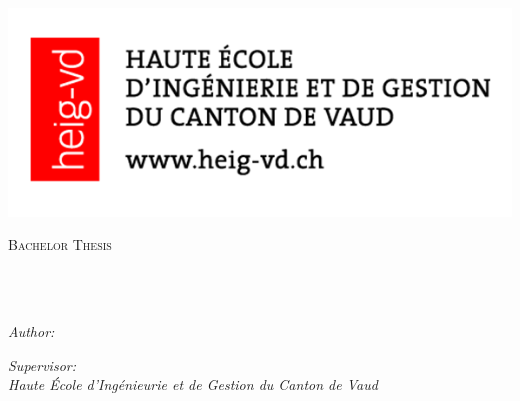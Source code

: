 \documentclass[
11pt, %
english, %
singlespacing, %
headsepline, %
]{MastersDoctoralThesis} %
\author{\textcolor{bleu}{Arthur \textsc{Passuello}}} %
\begin{document}
\frontmatter %

\pagestyle{plain} %


\begin{titlepage}

\vspace*{-20mm}
\includegraphics[scale = 0.5]{Figures/heigvd_logo.png}
\begin{center}
\textsc{\Large Bachelor Thesis}\\[0.5cm] %

\HRule \\[0.4cm] %
{\huge \bfseries \ttitle\par}\vspace{0.4cm} %
\HRule \\[1.5cm] %
\begin{minipage}[t]{0.4\textwidth}
\begin{flushleft} \large
\emph{Author:}\\
\href{http://www.johnsmith.com}{\authorname} %
\end{flushleft}
\end{minipage}
\begin{minipage}[t]{0.4\textwidth}
\begin{flushright} \large
\emph{Supervisor:} \\
\href{http://www.jamessmith.com}{\textcolor{red}{\supname}} \linebreak
\textit{\small{Haute École d'Ingénieurie et de Gestion du Canton de Vaud}} \linebreak  %


\end{flushright}
\end{minipage}
\end{center}
\end{titlepage}
\end{document}
